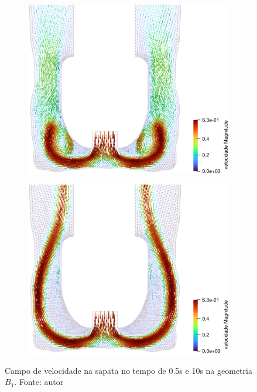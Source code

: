     \begin{figure}[H]
        \centering
        \begin{subfigure}[b]{0.42\linewidth}
            \includegraphics[width=\linewidth]{img/perfil_vel/rugoso/perfil_de_vel_sapata_paraview_0.5s.eps}
        \end{subfigure}
        \begin{subfigure}[b]{0.42\linewidth}
            \includegraphics[width=\linewidth]{img/perfil_vel/rugoso/perfil_de_vel_sapata_paraview_10s.eps}
        \end{subfigure}
    	
    	\caption{Campo de velocidade na sapata no tempo de 0.5s e 10s na geometria $B_1$. Fonte: autor}
    	\label{fig:perfil_velocidade_rugoso_sapata_paraview_0.5s}
    \end{figure}
    
